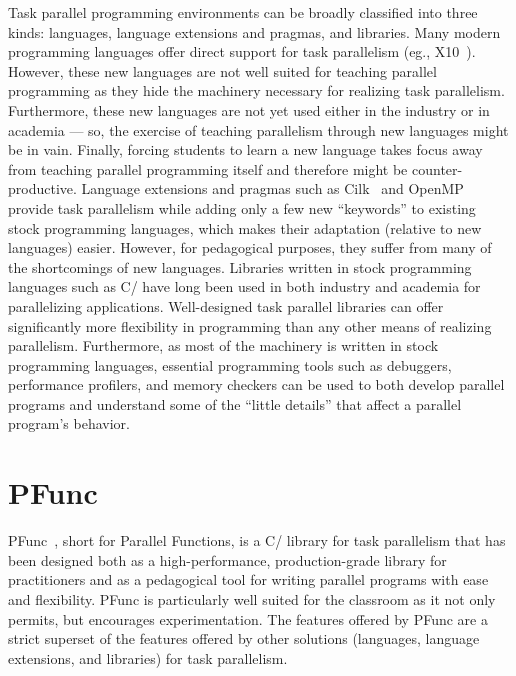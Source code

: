 \documentclass[9pt,twocolumn,letter]{article}
\begin{document}
Task parallel programming environments can be broadly classified into three
kinds: languages, language extensions and pragmas, and libraries.
Many modern programming languages offer direct support for task parallelism
(eg., X10~\cite{Charles:2005p1232}).
%
However, these new languages are not well suited for teaching parallel
programming as they hide the machinery necessary for realizing task
parallelism.
%
Furthermore, these new languages are not yet used either in the industry or in
academia --- so, the exercise of teaching parallelism through new languages 
might be in vain.
%
Finally, forcing students to learn a new language takes focus away from
teaching parallel programming itself and therefore might be counter-productive.
Language extensions and pragmas such as Cilk~\cite{FrigoLeRa98} and
OpenMP~\cite{kn:omp_30} provide task parallelism while adding only a few new
``keywords'' to existing stock programming languages, which makes their
adaptation (relative to new languages) easier.
%
However, for pedagogical purposes, they suffer from many of the shortcomings of
new languages.
Libraries written in stock programming languages such as C/\Cpp{} have long 
been used in both industry and academia for parallelizing applications.
%
Well-designed task parallel libraries can offer significantly more
flexibility in programming than any other means of realizing
parallelism.
%
Furthermore, as most of the machinery is written in stock programming
languages, essential programming tools such as debuggers, performance
profilers, and memory checkers can be used to both develop parallel programs
and understand some of the ``little details'' that affect a parallel program's
behavior.

%
%
%
\section{PFunc}
\label{sec:pfunc}
PFunc~\cite{kambadur09:pfunc}, short for Parallel Functions, is a C/\Cpp{}
library for task parallelism that has been designed both as a
high-performance, production-grade library for practitioners and as a
pedagogical tool for writing parallel programs with ease and flexibility.
%
PFunc is particularly well suited for the classroom as it not only permits, but
encourages experimentation.
%
The features offered by PFunc are a strict superset of the features offered by
other solutions (languages, language extensions, and libraries) for task
parallelism.
\end{document}
